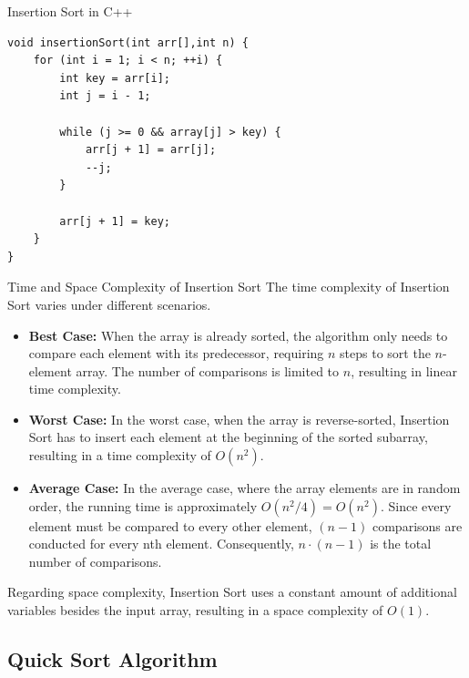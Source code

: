 \begin{frame}[fragile]{Insertion Sort in C++}
    \begin{lstlisting}[style=cppStyle]
void insertionSort(int arr[],int n) {
    for (int i = 1; i < n; ++i) {
        int key = arr[i];
        int j = i - 1;

        while (j >= 0 && array[j] > key) {
            arr[j + 1] = arr[j];
            --j;
        }

        arr[j + 1] = key;
    }
}
    \end{lstlisting}
\end{frame}

\begin{frame}{Time and Space Complexity of Insertion Sort}
    The time complexity of Insertion Sort varies under different scenarios.

    \begin{itemize}
        \item \textbf{Best Case:} When the array is already sorted, the algorithm only needs to compare each element with its predecessor, requiring $n$ steps to sort the $n$-element array. The number of comparisons is limited to $n$, resulting in linear time complexity.
        
        \item \textbf{Worst Case:} In the worst case, when the array is reverse-sorted, Insertion Sort has to insert each element at the beginning of the sorted subarray, resulting in a time complexity of $O(n^2)$.
        
        \item \textbf{Average Case:} In the average case, where the array elements are in random order, the running time is approximately $O(n^2 / 4) = O(n^2)$. Since every element must be compared to every other element, $(n-1)$ comparisons are conducted for every nth element. Consequently, $n \cdot (n-1)$ is the total number of comparisons.
    \end{itemize}

    Regarding space complexity, Insertion Sort uses a constant amount of additional variables besides the input array, resulting in a space complexity of $O(1)$.
\end{frame}



\subsection{Quick Sort Algorithm}

